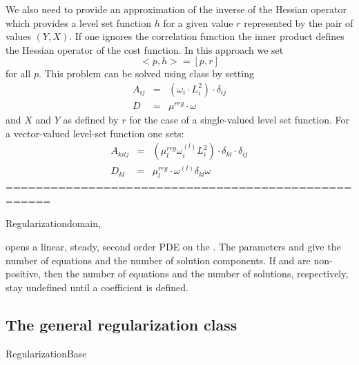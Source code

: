 We also need to provide an approximation of the inverse of the Hessian operator which provides a 
level set function $h$ for a given value $r$ represented by the pair of values $(Y,X)$. If one ignores the correlation function
the inner product defines the Hessian operator of the cost function. In this approach we set 
\begin{equation}\label{EQU:REG:8}
 < p,   h > = [p, r]
\end{equation} 
for all $p$. This problem can be solved using \escript {} class by setting
\begin{equation}\label{EQU:REG:8b}
\begin{array}{rcl}
 A_{ij} & =&  (\omega_i \cdot L_i^2) \cdot \delta_{ij}  \\
D & = & \mu^{reg} \cdot \omega
\end{array}
\end{equation} 
and $X$ and $Y$ as defined by $r$ for the case of a single-valued level set function.
For a vector-valued level-set function one sets:
\begin{equation}\label{EQU:REG:8c}
\begin{array}{rcl}
 A_{kilj} & = & (\mu^{reg}_l \omega^{(l)}_i L_i^2) \cdot  \delta_{kl} \cdot  \delta_{ij}  \\
D_{kl} & =  & \mu^{reg}_l  \cdot \omega^{(l)} \delta_{kl}  \omega
\end{array}
\end{equation} 
====================================================
\begin{classdesc}{Regularization}{domain, }

opens a linear, steady, second order PDE on the \Domain {}.
The parameters  and  give the number of
equations and the number of solution components.
If  and  are non-positive, then the number
of equations and the number of solutions, respectively, stay undefined until a
coefficient is defined.
\end{classdesc}
 


\subsection{The general regularization class}
\begin{classdesc}{RegularizationBase}{}

\end{classdesc}